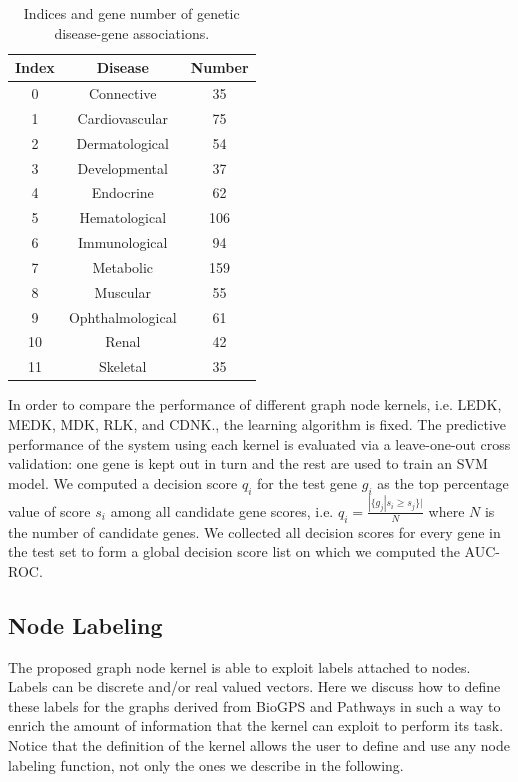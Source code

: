 \documentclass[review]{elsarticle}
\begin{document}
\begin{table}
\small
\centering
\caption{\label{tab:diseases} Indices and gene number of genetic disease-gene associations.} \vspace{1em}
\label{tab:cdnk-diseases}
\setlength{\tabcolsep}{1cm}
\begin{tabular}{ccc}
\hline
Index & Disease & Number\\
\hline
0 & Connective & 35 \\
1 & Cardiovascular & 75 \\
2 & Dermatological & 54 \\
3 & Developmental & 37 \\
4 & Endocrine & 62 \\
5 & Hematological & 106 \\
6 & Immunological & 94 \\
7 & Metabolic & 159 \\
8 & Muscular & 55 \\
9 & Ophthalmological & 61 \\
10 & Renal & 42 \\
11 & Skeletal & 35 \\
\hline
\end{tabular}
\end{table}%

In order to compare the performance of different graph node kernels, i.e. LEDK, MEDK, MDK, RLK, and CDNK., the learning algorithm is fixed. 
The predictive performance of the system using each kernel is evaluated via a leave-one-out cross validation: one gene is kept out in turn and the rest are used to train an SVM model. 
We computed a decision score $q_i$ for the test gene $g_i$ as the top percentage value of score $s_i$ among all candidate gene scores, i.e. $q_i = \frac{ |\lbrace g_j | s_i \geq s_j\rbrace |}{N}$ where $N$ is the number of candidate genes. We collected all decision scores for every gene in the test set to form a global decision score list on which we computed the AUC-ROC.

\subsection{Node Labeling} 
\label{sec:lab}
The proposed graph node kernel is able to exploit labels attached to nodes.  Labels can be discrete and/or real valued vectors. Here we discuss how to define these labels for the graphs derived from BioGPS and Pathways in such a way to enrich the amount of information that the kernel can exploit to perform its task.
Notice that the definition of the kernel allows the user to define and use any node labeling function, not only the ones we describe in the following.
\end{document}
